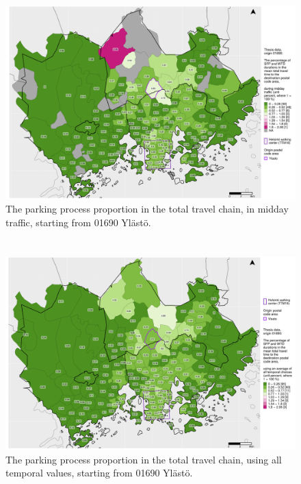 \begin{figure}
    \section{}
    \centering
    \includegraphics[trim={0.9cm 0.3cm 0.25cm 0.3cm},clip,width=\textwidth]{images/compare_traveltimes_mapfill-msc_m_pct_fromzip-01690_11-10-2020.png}
    \caption[Parking process proportion from Ylästö, midday traffic]{The parking process proportion in the total travel chain, in midday traffic, starting from 01690 Ylästö.}%
    \label{fig:compare_msc_m_pct_01690}%
\end{figure}

\begin{figure}
    \section{}
    \centering
    \includegraphics[trim={0.9cm 0.3cm 0.25cm 0.3cm},clip,width=\textwidth]{images/compare_traveltimes_mapfill-msc_all_pct_fromzip-01690_11-10-2020.png}
    \caption[Parking process proportion from Ylästö, all temporal values]{The parking process proportion in the total travel chain, using all temporal values, starting from 01690 Ylästö.}%
    \label{fig:compare_msc_all_pct_01690}%
\end{figure}
\restoregeometry